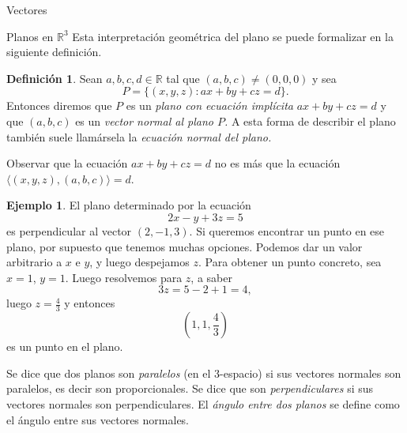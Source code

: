\documentclass[a4paper,12pt,twoside,spanish,reqno]{amsbook}
\theoremstyle{definition}
\newtheorem{definicion}{Definici\'on}[section]
\newtheorem{ejemplo}{Ejemplo}[section]
\theoremstyle{remark}
\newcommand{\la}{\langle}
\newcommand{\ra}{\rangle}
\newcommand{\R}{\mathbb R}
\begin{document}
\begin{chapter}{Vectores}
\begin{section}{Planos en $\R^3$}
        Esta interpretación geométrica del plano se puede formalizar en la siguiente definición.
        
        
        \begin{definicion}\label{def-eq-implicita-plano} Sean $a,b, c,d \in \R$ tal que $(a,b,c) \ne (0,0,0)$ y sea 
        \begin{equation*}
            P = \{(x,y,z): ax +by +cz =d\}.
        \end{equation*}
        Entonces diremos que $P$  es  un \textit{plano con ecuación implícita}\index{plano en $\R^3$!ecuación implícita}  $ax +by +cz =d$ y  que $(a,b,c)$ es un \textit{vector normal al plano $P$.} A esta forma de describir el plano también suele llamársela la \textit{ecuación normal del plano.}
        \end{definicion} 
        
        Observar que la ecuación $ ax +by +cz =d$ no es más que la ecuación $\la(x,y,z),(a,b,c) \ra=d$. 	
        
        \begin{ejemplo}
            El plano determinado por la ecuación
            \begin{equation*}
                2x - y 	+ 3z = 	5
            \end{equation*}
            es perpendicular al vector $(2, - 1, 3)$. Si queremos encontrar un punto en ese plano, por supuesto que tenemos muchas opciones. Podemos dar un valor arbitrario a $x$ e $y$, y luego despejamos $z$. Para obtener un punto concreto, sea $x = 1$, $y = 1$. Luego resolvemos para $z$, a saber
            \begin{equation*}
                3z 	= 5 - 2 + 1 = 4,
            \end{equation*}
            luego $z = \displaystyle\frac43$ y entonces
            \begin{equation*}
                (1,1,\frac43)
            \end{equation*}
            es un punto en el plano.
        \end{ejemplo}
        
        Se dice que dos planos son \textit{paralelos} (en el 3-espacio) si sus vectores normales son paralelos,  es decir son proporcionales. Se dice que son \textit{perpendiculares} si sus vectores normales son perpendiculares. El \textit{ángulo entre dos planos} se define como el ángulo entre sus vectores normales.
        
        
        

\end{section}
\end{chapter}
\end{document}
